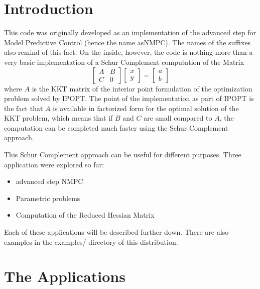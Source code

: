 \documentclass[a4paper]{article}
\begin{document}
\section{Introduction}
This code was originally developed as an implementation of the advanced step for Model Predictive Control (hence the name asNMPC). The names of the suffixes also remind of this fact. On the inside, however, the code is nothing more than a very basic implementation of a Schur Complement computation of the Matrix
\begin{equation}
  \left[\begin{array}{c|c}A&B\\\hline C&0\end{array}\right]\left[\begin{array}{c}x\\\hline y\end{array}\right] = \left[\begin{array}{c}a\\\hline b\end{array}\right]
\end{equation}
where $A$ is the KKT matrix of the interior point formulation of the optimization problem solved by IPOPT. The point of the implementation as part of IPOPT is the fact that $A$ is available in factorized form for the optimal solution of the KKT problem, which means that if $B$ and $C$ are small compared to $A$, the computation can be completed much faster using the Schur Complement approach.

This Schur Complement approach can be useful for different purposes. Three application were explored so far:
\begin{itemize}
\item advanced step NMPC
\item Parametric problems
\item Computation of the Reduced Hessian Matrix
\end{itemize}

Each of these applications will be described further down. There are also examples in the examples/ directory of this distribution. 

\section{The Applications}
\end{document}
